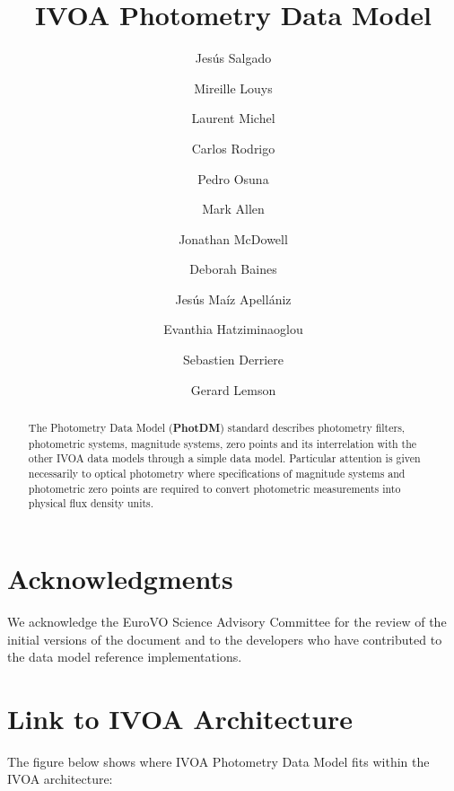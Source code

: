 \documentclass[11pt,a4paper]{ivoa}
\title{IVOA Photometry Data Model}
\author{Jesús Salgado}
\author{Mireille Louys}
\author{Laurent Michel}
\author{Carlos Rodrigo}
\author{Pedro Osuna}
\author{Mark Allen}
\author{Jonathan McDowell}
\author{Deborah Baines}
\author{Jesús Maíz Apellániz}
\author{Evanthia Hatziminaoglou}
\author{Sebastien \mbox{Derriere}}
\author{Gerard Lemson}
\begin{document}
\begin{abstract}
The Photometry Data Model (\textbf{PhotDM}) standard describes photometry 
filters, photometric systems, magnitude systems, zero points and its 
interrelation with the other IVOA data models through a simple data model. 
Particular attention is given necessarily to optical photometry where 
specifications of magnitude systems and photometric zero points are required 
to convert photometric measurements into physical flux density units.
\end{abstract}

\section*{Acknowledgments}
We acknowledge the EuroVO Science Advisory Committee for the review of the 
initial versions of the document and to the developers who have contributed 
to the data model reference implementations.
\pagebreak

\section*{Link to IVOA Architecture}
The figure below shows where IVOA Photometry Data Model fits within the 
IVOA architecture:


\end{document}
